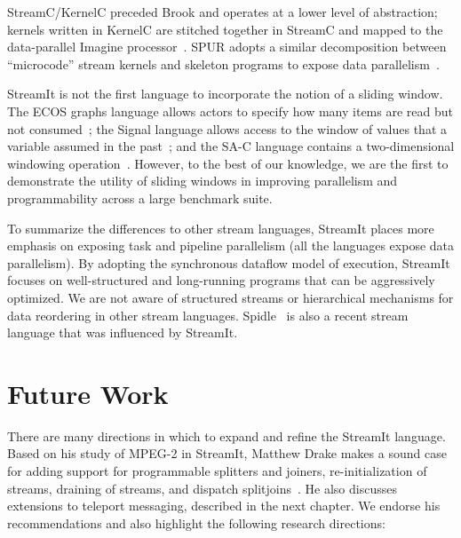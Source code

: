 Stream\-C/Ker\-nel\-C preceded Brook and operates at a lower level of
abstraction; kernels written in KernelC are stitched together in
StreamC and mapped to the data-parallel Imagine
processor~\cite{imagine03ieee}.  SPUR adopts a similar decomposition
between ``microcode'' stream kernels and skeleton programs to expose
data parallelism~\cite{spur05samos}.

StreamIt is not the first language to incorporate the notion of a
sliding window.  The ECOS graphs language allows actors to specify how
many items are read but not consumed~\cite{huang_ecos_1992}; the
Signal language allows access to the window of values that a variable
assumed in the past~\cite{le_guernic_signal--data_1986}; and the SA-C
language contains a two-dimensional windowing
operation~\cite{draper_compiling_2001}.  However, to the best of our
knowledge, we are the first to demonstrate the utility of sliding
windows in improving parallelism and programmability across a large
benchmark suite.

To summarize the differences to other stream languages, StreamIt
places more emphasis on exposing task and pipeline parallelism (all
the languages expose data parallelism).
By adopting the synchronous dataflow model of execution, StreamIt
focuses on well-structured and long-running programs that can be
aggressively optimized.  We are not aware of structured streams or
hierarchical mechanisms for data reordering in other stream languages.
Spidle~\cite{spidle03} is also a recent stream language that was
influenced by StreamIt.

\section{Future Work}
\label{sec:lang-future-work}

\vspace{12pt}

There are many directions in which to expand and refine the StreamIt
language.  Based on his study of MPEG-2 in StreamIt, Matthew Drake
makes a sound case for adding support for programmable splitters and
joiners, re-initialization of streams, draining of streams, and
dispatch splitjoins~\cite{drake-thesis}.  He also discusses extensions
to teleport messaging, described in the next chapter.  We endorse his
recommendations and also highlight the following research directions:

